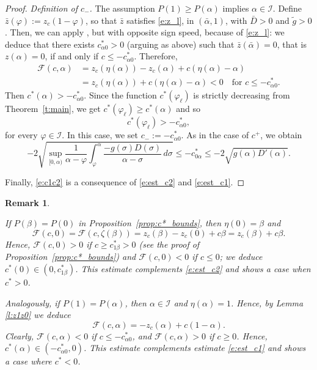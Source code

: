 \documentclass[11pt,a4paper]{article}
\newtheorem{remark}{Remark}[section]
\renewcommand{\phi}{\varphi}
\begin{document}
\begin{proof}
\medskip
{\em Definition of $c_{-}$.} 
The assumption $P(1)\ge P(\alpha)$ implies  $\alpha \in \mathcal I$. Define $\bar z(\varphi):=z_c(1-\varphi)$, so that $\bar z$ satisfies \eqref{e:z_l}, in $(\bar\alpha,1)$, with $\bar D>0$ and $\tilde g>0$. Then, we can apply \cite[Proposition 3]{BCM2}, but with opposite sign speed, because of \eqref{e:z_l}: we deduce that there exists $c^*_{\alpha0}> 0$ (arguing as above) such that $\bar z(\bar\alpha)=0$, that is $z(\alpha)=0$, if and only if $c \le -c^*_{\alpha0}$.  Therefore,
\begin{equation*}
\begin{aligned}
\mathcal F(c,\alpha)&= z_c\left(\eta(\alpha)\right)-z_c(\alpha)+c\left(\eta(\alpha)-\alpha\right)
\\
&=z_c\left(\eta(\alpha)\right)+c\left(\eta(\alpha)-\alpha\right)<0 
\quad \text{for } c \le -c_{\alpha0}^*.
\end{aligned}
\end{equation*}
Then $c^*(\alpha)>-c_{\alpha0}^*$. Since the function $c^*(\varphi_\ell)$ is strictly decreasing from Theorem~\ref{t:main}, we get $c^*(\phi_\ell)\ge c^*(\alpha)$ and so
\[
c^*(\varphi_\ell)> -c_{\alpha0}^*,
\]
for every $\varphi \in \mathcal I$. In this case, we set $c_{-}:=-c_{\alpha0}^*$.
As in the case of $c^+$, we obtain %
\begin{equation}
\label{e:est_c1}
-2\sqrt{\sup_{[0, \alpha)}\frac{1}{\alpha - \phi}\int_{\phi}^{\alpha}\frac{-g(\sigma)D(\sigma)}{\alpha-\sigma}\, d\sigma}\le -c^*_{0\alpha} \le -2\sqrt{g(\alpha)D'(\alpha)}.
\end{equation}


\medskip

Finally, \eqref{e:c1c2} is a consequence of \eqref{e:est_c2} and \eqref{e:est_c1}.
\end{proof}


\begin{remark}\label{r:skkwe}
{\rm
If $P(\beta)=P(0)$ in Proposition~\ref{prop:c*_bounds}, then $\eta(0)=\beta$ and
\[
\mathcal F(c,0)=\mathcal F\left(c,\zeta(\beta)\right)=z_c(\beta)-z_c(0)+c\beta = z_c(\beta)+c\beta.
\]
Hence, $\mathcal F(c,0) >0$ if $c \ge c^*_{1\beta}>0$ (see the proof of Proposition~\ref{prop:c*_bounds})  and $\mathcal F(c,0)<0$ if $c \le 0$; we deduce $c^*(0) \in (0, c^*_{1\beta})$. This estimate complements \eqref{e:est_c2} and shows a case when $c^*>0$. 

Analogously, if $P(1)=P(\alpha)$, then $\alpha \in \mathcal I$ and $\eta(\alpha)=1$. Hence, by Lemma \ref{l:z1z0} we deduce
\[
\mathcal F(c,\alpha)=-z_c(\alpha)+c(1-\alpha).
\]
Clearly, $\mathcal F(c,\alpha)<0$ if $c\le -c^*_{\alpha0}$, and $\mathcal F(c,\alpha)>0$ if $c \ge 0$. Hence, $c^*(\alpha) \in (-c^*_{\alpha0},0)$. This estimate complements estimate \eqref{e:est_c1} and shows a case where $c^*<0$.
}
\end{remark}
\end{document}
